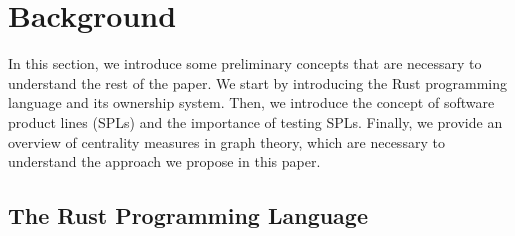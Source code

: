 \section{Background}\label{sec:bg}

In this section, we introduce some preliminary concepts that are necessary to understand the rest of the paper. 
We start by introducing the Rust programming language and its ownership system.
Then, we introduce the concept of software product lines (SPLs) and the importance of testing SPLs.
Finally, we provide an overview of centrality measures in graph theory, which are necessary to understand the approach we propose in this paper.

\subsection{The Rust Programming Language}\label{subsec:bg:rust}

